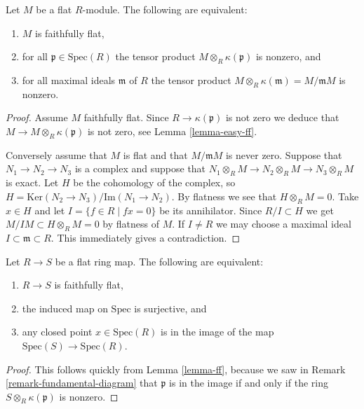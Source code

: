 \begin{lemma}
\label{lemma-ff}
Let $M$ be a flat $R$-module.
The following are equivalent:
\begin{enumerate}
\item $M$ is faithfully flat,
\item for all $\mathfrak p \in \text{Spec}(R)$
the tensor product $M\otimes_R \kappa(\mathfrak p)$ is nonzero, and
\item for all maximal ideals $\mathfrak m$ of $R$
the tensor product $M\otimes_R \kappa(\mathfrak m) = M/{\mathfrak m}M$
is nonzero.
\end{enumerate}
\end{lemma}

\begin{proof}
Assume $M$ faithfully flat. Since $R \to \kappa({\mathfrak p})$ is not
zero we deduce that $M \to M \otimes_R \kappa({\mathfrak p})$ is not zero,
see Lemma \ref{lemma-easy-ff}.

\medskip\noindent
Conversely assume that $M$ is flat and that
$M/{\mathfrak m}M$ is never zero.
Suppose that $N_1 \to N_2 \to N_3$ is a complex and
suppose that $N_1 \otimes_R M \to N_2\otimes_R M \to
N_3\otimes_R M$ is exact. Let $H$ be the cohomology of the complex,
so $H = \text{Ker}(N_2 \to N_3)/\text{Im}(N_1 \to N_2)$.
By flatness we see that $H \otimes_R M = 0$. 
Take $x \in H$ and let $I = \{f \in R \mid fx = 0 \}$
be its annihilator. Since $R/I \subset H$ we get
$M/IM \subset H\otimes_R M = 0$ by flatness of $M$.
If $I \not=  R$ we may choose
a maximal ideal $I \subset \mathfrak m \subset R$.
This immediately gives a contradiction.
\end{proof}

\begin{lemma}
\label{lemma-ff-rings}
Let $R \to S$ be a flat ring map.
The following are equivalent:
\begin{enumerate}
\item $R \to S$ is faithfully flat,
\item the induced map on $\text{Spec}$ is surjective, and
\item any closed point $x \in \text{Spec}(R)$ is
in the image of the map $\text{Spec}(S) \to \text{Spec}(R)$.
\end{enumerate}
\end{lemma}

\begin{proof}
This follows quickly from Lemma \ref{lemma-ff}, because we
saw in Remark \ref{remark-fundamental-diagram}
that $\mathfrak p$ is in the image
if and only if the ring $S \otimes_R \kappa(\mathfrak p)$
is nonzero.
\end{proof}

